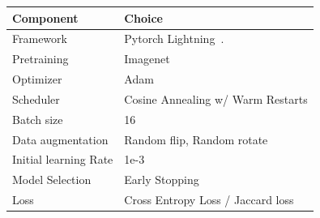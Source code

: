 
\begin{tabularx}{\linewidth}{p{3cm}X}
\toprule
     \textbf{Component} & \textbf{Choice} \\
\midrule
     Framework & Pytorch Lightning~\cite{lightning}.\\
     Pretraining & Imagenet\\
     Optimizer & Adam~\cite{adam}\\
     Scheduler & Cosine Annealing w/ Warm Restarts\\
     Batch size & 16 \\
     Data augmentation & Random flip, Random rotate\\
     Initial learning Rate & 1e-3 \\
     Model Selection & Early Stopping \\
     Loss & Cross Entropy Loss / Jaccard loss \\
\bottomrule
\end{tabularx}
